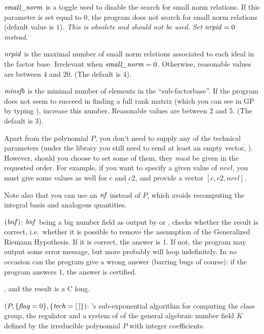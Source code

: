 $\hbox{\it small\_norm\/}$ is a toggle used to disable the search for small norm
relations. If this parameter is set equal to $0$, the program does not search
for small norm relations (default value is $1$). \emph{This is obsolete and
should not be used. Set $\hbox{\it nrpid\/} = 0$ instead}.

$\hbox{\it nrpid\/}$ is the maximal number of small norm relations associated to each
ideal in the factor base. Irrelevant when $\hbox{\it small\_norm\/}=0$. Otherwise,
reasonable values are between 4 and 20. (The default is 4).

$\hbox{\it minsfb\/}$ is the minimal number of elements in the ``sub-factorbase''.
If the program does not seem to succeed in finding a full rank matrix (which
you can see in GP by typing ), increase this number. Reasonable
values are between 2 and 5. (The default is 3).


Apart from the polynomial $P$, you don't need to supply any of the technical
parameters (under the library you still need to send at least an empty
vector, ). However, should you choose to set some of
them, they \emph{must} be given in the requested order. For example, if you
want to specify a given value of $nrel$, you must give some values as well
for $c$ and $c2$, and provide a vector $[c,c2,nrel]$.

Note also that you can use an $\hbox{\it nf\/}$ instead of $P$, which avoids
recomputing the integral basis and analogous quantities.

\smallskip
{}$(\hbox{\it bnf\/})$: $\hbox{\it bnf\/}$ being a big number field
as output by  or , checks whether the result
is correct, i.e.~whether it is possible to remove the assumption of the
Generalized Riemann Hypothesis. If it is correct, the answer is 1.
If not, the program may output some error message, but more probably will loop
indefinitely. In \emph{no} occasion can the program give a wrong answer
(barring bugs of course): if the program answers 1, the answer is certified.

, and the result is a C long.

$(P,\{\hbox{\it f\kern0pt lag\/}=0\},\{\hbox{\it tech\/}=[\,]\})$: 's
sub-exponential algorithm for computing the class group, the regulator and a
system of  of the general algebraic number field $K$
defined by the irreducible polynomial $P$ with integer coefficients.

